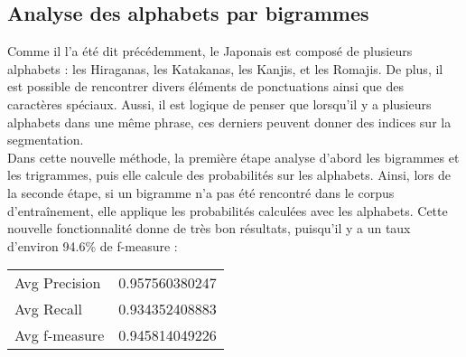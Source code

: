 
\subsection{Analyse des alphabets par bigrammes}

Comme il l'a été dit précédemment, le Japonais est composé de plusieurs alphabets : les Hiraganas, les Katakanas, les Kanjis, et les Romajis. De plus, il est possible de rencontrer divers éléments de ponctuations ainsi que des caractères spéciaux. Aussi, il est logique de penser que lorsqu'il y a plusieurs alphabets dans une même phrase, ces derniers peuvent donner des indices sur la segmentation. \\

Dans cette nouvelle méthode, la première étape analyse d'abord les bigrammes et les trigrammes, puis elle calcule des probabilités sur les alphabets. Ainsi, lors de la seconde étape, si un bigramme n'a pas été rencontré dans le corpus d'entraînement, elle applique les probabilités calculées avec les alphabets. Cette nouvelle fonctionnalité donne de très bon résultats, puisqu'il y a un taux d'environ 94.6\% de f-measure :
\begin{center}
	\begin{tabular}{|l c|}
	  	\hline
	  	Avg Precision & 0.957560380247 \\
		Avg Recall & 0.934352408883 \\
		Avg f-measure & 0.945814049226 \\
	  	\hline
	\end{tabular}
\end{center}
	
	

